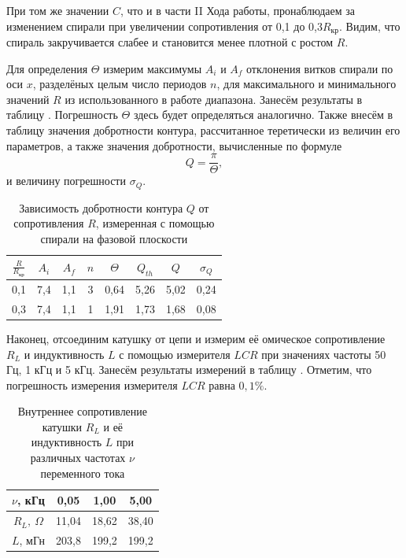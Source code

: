 \documentclass[a4paper,10pt]{article}
\begin{document}
При том же значении $C$, что и в части II Хода работы, пронаблюдаем за изменением спирали при увеличении сопротивления от 0,1 до 0,3$R_{\text{кр}}$. Видим, что спираль закручивается слабее и становится менее плотной с ростом $R$.

Для определения $\Theta$ измерим максимумы $A_i$ и $A_f$ отклонения витков спирали по оси $x$, разделёных целым число периодов $n$, для максимального и минимального значений $R$ из использованного в работе диапазона. Занесём результаты в таблицу . Погрешность $\Theta$ здесь будет определяться аналогично. Также внесём в таблицу значения добротности контура, рассчитанное теретически из величин его параметров, а также значения добротности, вычисленные по формуле\[Q=\frac{\pi}{\Theta},\]и величину погрешности $\sigma_Q$.

\begin{table}[h]
	\centering
	\caption{Зависимость добротности контура $Q$ от сопротивления $R$, измеренная с помощью спирали на фазовой плоскости} \label{lst}
	\begin{tabular}{|c|c|c|c|c|c|c|c|}
		\hline
		$\frac{R}{R_{\text{кр}}}$ & $A_i$ & $A_f$ & $n$ & $\Theta$ & $Q_{th}$ & $Q$ & $\sigma_Q$ \\ \hline
		0,1 & 7,4 & 1,1 & 3 & 0,64 & 5,26 & 5,02 & 0,24 \\ \hline
		0,3 & 7,4 & 1,1 & 1 & 1,91 & 1,73 & 1,68 & 0,08 \\ \hline
	\end{tabular}
\end{table}

Наконец, отсоединим катушку от цепи и измерим её омическое сопротивление $R_L$ и индуктивность $L$ с помощью измерителя $LCR$ при значениях частоты 50 Гц, 1 кГц и 5 кГц. Занесём результаты измерений в таблицу . Отметим, что погрешность измерения измерителя $LCR$ равна $0,1\%$.

\begin{table}[h]
	\centering
	\caption{Внутреннее сопротивление катушки $R_L$ и её индуктивность $L$ при различных частотах $\nu$ переменного тока} \label{zaeblo}
	\begin{tabular}{|c|c|c|c|}
		\hline
		$\nu$, кГц & 0,05 & 1,00 & 5,00 \\ \hline
		$R_L,\ \Omega$ & 11,04 & 18,62 & 38,40 \\ \hline
		$L$, мГн & 203,8 & 199,2 & 199,2 \\ \hline
	\end{tabular}
\end{table}
\end{document}
